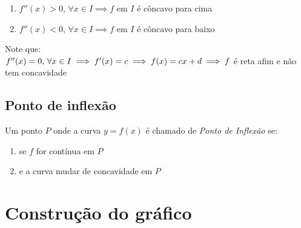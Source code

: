 \begin{enumerate}
    \item \(f''(x) > 0,\, \forall x \in I \implies f\) em \(I\) é côncavo para cima
    \item \(f''(x) < 0,\, \forall x \in I \implies f\) em \(I\) é côncavo para baixo
\end{enumerate}

\begin{remark}
    Note que:\\
    \(f''(x) = 0,\, \forall x \in I \\
    \implies f'(x) = c \\
    \implies f(x) = cx + d \\ 
    \implies f\) é reta afim e não tem concavidade
\end{remark}

\subsection{Ponto de inflexão}

\begin{definition}
    Um ponto \(P\) onde a curva \(y = f(x)\) é chamado de \textit{Ponto de Inflexão} se:
    \begin{enumerate}
        \item se \(f\) for contínua em \(P\)
        \item e a curva mudar de concavidade em \(P\)
    \end{enumerate}
\end{definition}


\section{Construção do gráfico}


